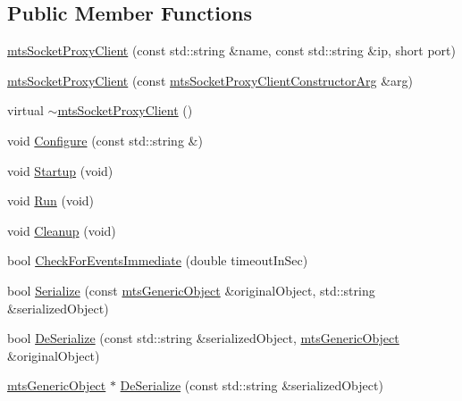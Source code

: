 \subsection*{Public Member Functions}
\begin{DoxyCompactItemize}
\item 
\hyperlink{classmts_socket_proxy_client_a9c0a9b0c6296cb0c358224264c09400a}{mts\-Socket\-Proxy\-Client} (const std\-::string \&name, const std\-::string \&ip, short port)
\item 
\hyperlink{classmts_socket_proxy_client_ac82380de41130f912f003b1631092974}{mts\-Socket\-Proxy\-Client} (const \hyperlink{classmts_socket_proxy_client_constructor_arg}{mts\-Socket\-Proxy\-Client\-Constructor\-Arg} \&arg)
\item 
virtual \hyperlink{classmts_socket_proxy_client_af612608c01a2d5d9568d7f1827008fe7}{$\sim$mts\-Socket\-Proxy\-Client} ()
\item 
void \hyperlink{classmts_socket_proxy_client_acf195f7226080220c9dc96bf7657575e}{Configure} (const std\-::string \&)
\item 
void \hyperlink{classmts_socket_proxy_client_a28558277e1f96b6cd469dcb486f2897b}{Startup} (void)
\item 
void \hyperlink{classmts_socket_proxy_client_a7a45114ab6273e061801d8610a2f0507}{Run} (void)
\item 
void \hyperlink{classmts_socket_proxy_client_af5898c763a908439e34a59cac4ae3b1a}{Cleanup} (void)
\item 
bool \hyperlink{classmts_socket_proxy_client_a275353ca488e59029ab051b033fc4379}{Check\-For\-Events\-Immediate} (double timeout\-In\-Sec)
\item 
bool \hyperlink{classmts_socket_proxy_client_a7690d30c3b85a65435911de328a5fe75}{Serialize} (const \hyperlink{classmts_generic_object}{mts\-Generic\-Object} \&original\-Object, std\-::string \&serialized\-Object)
\item 
bool \hyperlink{classmts_socket_proxy_client_ab5f6d0a8d994118897463151b664c1e8}{De\-Serialize} (const std\-::string \&serialized\-Object, \hyperlink{classmts_generic_object}{mts\-Generic\-Object} \&original\-Object)
\item 
\hyperlink{classmts_generic_object}{mts\-Generic\-Object} $\ast$ \hyperlink{classmts_socket_proxy_client_a55cd555d4b64f92c7f7f8dbfd06ef704}{De\-Serialize} (const std\-::string \&serialized\-Object)
\end{DoxyCompactItemize}
